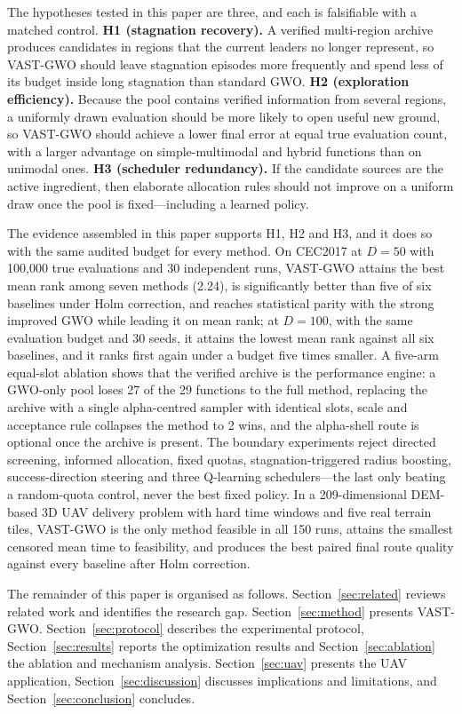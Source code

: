 \documentclass[11pt,a4paper]{article}
\newcommand{\method}{VAST-GWO}
\begin{document}
The hypotheses tested in this paper are three, and each is falsifiable with a
matched control. \textbf{H1 (stagnation recovery).} A verified multi-region
archive produces candidates in regions that the current leaders no longer
represent, so \method{} should leave stagnation episodes more frequently and
spend less of its budget inside long stagnation than standard GWO.
\textbf{H2 (exploration efficiency).} Because the pool contains verified
information from several regions, a uniformly drawn evaluation should be more
likely to open useful new ground, so \method{} should achieve a lower final
error at equal true evaluation count, with a larger advantage on
simple-multimodal and hybrid functions than on unimodal ones. \textbf{H3
(scheduler redundancy).} If the candidate sources are the active ingredient,
then elaborate allocation rules should not improve on a uniform draw once the
pool is fixed---including a learned policy.

The evidence assembled in this paper supports H1, H2 and H3, and it does so
with the same audited budget for every method. On CEC2017 at $D=50$ with
100{,}000 true evaluations and 30 independent runs, \method{} attains the best
mean rank among seven methods (2.24), is significantly better than five of six
baselines under Holm correction, and reaches statistical parity with the strong
improved GWO while leading it on mean rank; at $D=100$, with the same
evaluation budget and 30 seeds, it attains the lowest mean rank against all six
baselines, and it ranks first again under a budget five times smaller. A five-arm equal-slot ablation shows that
the verified archive is the performance engine: a GWO-only pool loses 27 of the
29 functions to the full method, replacing the archive with a single
alpha-centred sampler with identical slots, scale and acceptance rule collapses
the method to 2 wins, and
the alpha-shell route is optional once the archive is present. The boundary
experiments reject directed screening, informed allocation, fixed quotas,
stagnation-triggered radius boosting, success-direction steering and three
Q-learning schedulers---the last only beating a random-quota control, never the
best fixed policy. In a 209-dimensional DEM-based 3D UAV delivery problem with
hard time windows and five real terrain tiles, \method{} is the only method
feasible in all 150 runs, attains the smallest censored mean time to
feasibility, and produces the best paired final route quality against every
baseline after Holm correction.

The remainder of this paper is organised as follows. Section~\ref{sec:related}
reviews related work and identifies the research gap.
Section~\ref{sec:method} presents \method{}. Section~\ref{sec:protocol}
describes the experimental protocol, Section~\ref{sec:results} reports the
optimization results and Section~\ref{sec:ablation} the ablation and mechanism
analysis. Section~\ref{sec:uav} presents the UAV application,
Section~\ref{sec:discussion} discusses implications and limitations, and
Section~\ref{sec:conclusion} concludes.
\end{document}

